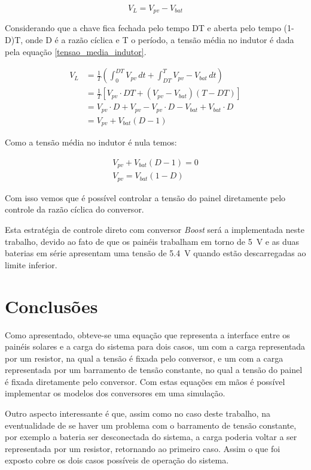 \begin{equation} \label{tensao_indutor_segunda_etapa}
V_{L} = V_{pv} - V_{bat}
\end{equation}

Considerando que a chave fica fechada pelo tempo DT e aberta pelo tempo (1-D)T, onde D é a razão cíclica e T o período, a tensão média no indutor é dada pela equação \ref{tensao_media_indutor}.

\begin{equation} \label{tensao_media_indutor}
\begin{aligned}
V_{L} &= \frac{1}{T}\left(\int_{0}^{DT} V_{pv}\,dt + \int_{DT}^{T} V_{pv} - V_{bat}\,dt\right) \\
&= \frac{1}{T}\left[V_{pv}\cdot DT + (V_{pv}-V_{bat})(T-DT)\right] \\
&= V_{pv}\cdot D + V_{pv} - V_{pv}\cdot D - V_{bat} +V_{bat}\cdot D \\
&= V_{pv} + V_{bat}(D-1)
\end{aligned}
\end{equation}

Como a tensão média no indutor é nula temos:

\begin{equation}
\begin{gathered}
V_{pv} + V_{bat}(D-1) = 0 \\
V_{pv} = V_{bat}(1-D) 
\end{gathered}
\end{equation}

Com isso vemos que é possível controlar a tensão do painel diretamente pelo controle da razão cíclica do conversor.

Esta estratégia de controle direto com conversor \textit{Boost} será a implementada neste trabalho, devido ao fato de que os painéis trabalham em torno de \SI{5}{\volt} e as duas baterias em série apresentam uma tensão de \SI{5,4}{\volt} quando estão descarregadas ao limite inferior.

\section{Conclusões}

Como apresentado, obteve-se uma equação que representa a interface entre os painéis solares e a carga do sistema para dois casos, um com a carga representada por um resistor, na qual a tensão é fixada pelo conversor, e um com a carga representada por um barramento de tensão constante, no qual a tensão do painel é fixada diretamente pelo conversor. Com estas equações em mãos é possível implementar os modelos dos conversores em uma simulação.

Outro aspecto interessante é que, assim como no caso deste trabalho, na eventualidade de se haver um problema com o barramento de tensão constante, por exemplo a bateria ser desconectada do sistema, a carga poderia voltar a ser representada por um resistor, retornando ao primeiro caso. Assim o que foi exposto cobre os dois casos possíveis de operação do sistema.